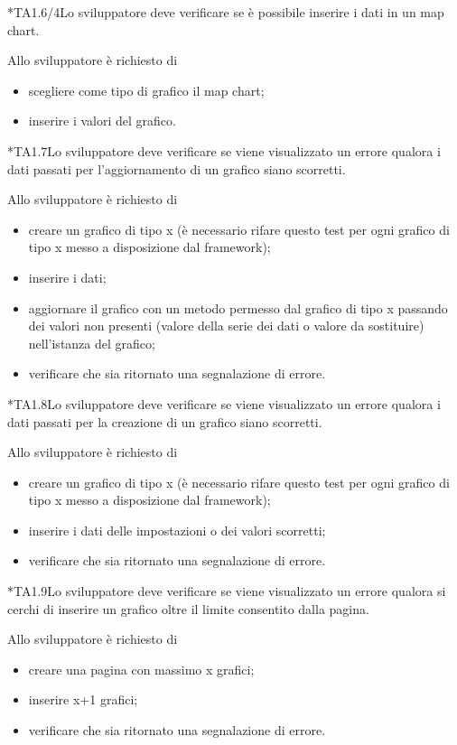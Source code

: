 	*{TA1.6/4}Lo sviluppatore deve verificare se è possibile inserire i dati in un map chart.

		Allo sviluppatore è richiesto di
		\begin{itemize}
			\item scegliere come tipo di grafico il map chart;
			\item inserire i valori del grafico.
		\end{itemize}

	*{TA1.7}Lo sviluppatore deve verificare se viene visualizzato un errore qualora i dati passati per l'aggiornamento di un grafico siano scorretti.

		Allo sviluppatore è richiesto di
		\begin{itemize}
			\item creare un grafico di tipo x (è necessario rifare questo test per ogni grafico di tipo x messo a disposizione dal framework);
			\item inserire i dati;
			\item aggiornare il grafico con un metodo permesso dal grafico  di tipo x passando dei valori non presenti (valore della serie dei dati o valore da sostituire) nell'istanza del grafico;
			\item verificare che sia ritornato una segnalazione di errore.
		\end{itemize}

	*{TA1.8}Lo sviluppatore deve verificare se viene visualizzato un errore qualora i dati passati per la creazione di un grafico siano scorretti.

		Allo sviluppatore è richiesto di
		\begin{itemize}
			\item creare un grafico di tipo x (è necessario rifare questo test per ogni grafico di tipo x messo a disposizione dal framework);
			\item inserire i dati delle impostazioni o dei valori scorretti;
			\item verificare che sia ritornato una segnalazione di errore.
		\end{itemize}

	*{TA1.9}Lo sviluppatore deve verificare se viene visualizzato un errore qualora si cerchi di inserire un grafico oltre il limite consentito dalla pagina.

		Allo sviluppatore è richiesto di
		\begin{itemize}
			\item creare una pagina con massimo x grafici;
			\item inserire x+1 grafici;
			\item verificare che sia ritornato una segnalazione di errore.
		\end{itemize}

